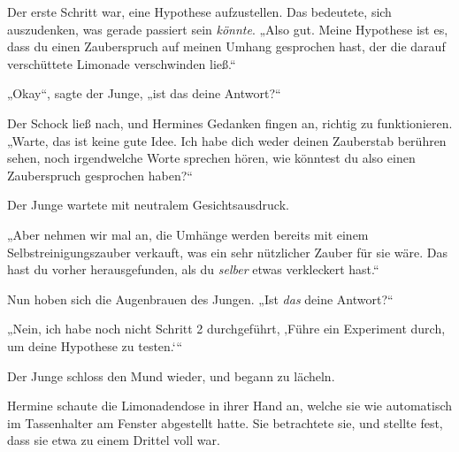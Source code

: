 Der erste Schritt war, eine Hypothese aufzustellen. Das bedeutete, sich auszudenken, was gerade passiert sein \emph{könnte}. „Also gut. Meine Hypothese ist es, dass du einen Zauberspruch auf meinen Umhang gesprochen hast, der die darauf verschüttete Limonade verschwinden ließ.“

„Okay“, sagte der Junge, „ist das deine Antwort?“

Der Schock ließ nach, und Hermines Gedanken fingen an, richtig zu funktionieren. „Warte, das ist keine gute Idee. Ich habe dich weder deinen Zauberstab berühren sehen, noch irgendwelche Worte sprechen hören, wie könntest du also einen Zauberspruch gesprochen haben?“

Der Junge wartete mit neutralem Gesichtsausdruck.

„Aber nehmen wir mal an, die Umhänge werden bereits mit einem Selbstreinigungszauber verkauft, was ein sehr nützlicher Zauber für sie wäre. Das hast du vorher herausgefunden, als du \emph{selber} etwas verkleckert hast.“

Nun hoben sich die Augenbrauen des Jungen. „Ist \emph{das} deine Antwort?“

„Nein, ich habe noch nicht Schritt 2 durchgeführt, ‚Führe ein Experiment durch, um deine Hypothese zu testen.‘“

Der Junge schloss den Mund wieder, und begann zu lächeln.

Hermine schaute die Limonadendose in ihrer Hand an, welche sie wie automatisch im Tassenhalter am Fenster abgestellt hatte. Sie betrachtete sie, und stellte fest, dass sie etwa zu einem Drittel voll war.

